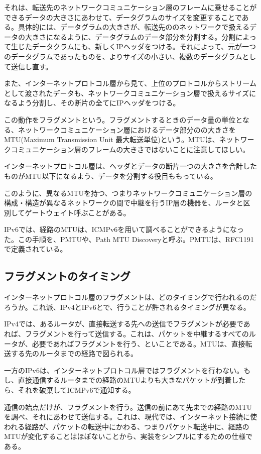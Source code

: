 それは、転送先のネットワークコミュニケーション層のフレームに乗せることができるデータの大きさにあわせて、データグラムのサイズを変更することである。具体的には、データグラムの大きさが、転送先ののネットワークで扱えるデータの大きさになるように、データグラムのデータ部分を分割する。分割によって生じたデータクラムにも、新しくIPヘッダをつける。それによって、元が一つのデータグラムであったものを、よりサイズの小さい、複数のデータグラムとして送信し直す。

また、インターネットプロトコル層から見て、上位のプロトコルからストリームとして渡されたデータも、ネットワークコミュニケーション層で扱えるサイズになるよう分割し、その断片の全てにIPヘッダをつける。

この動作をフラグメントという。フラグメントするときのデータ量の単位となる、ネットワークコミュニケーション層におけるデータ部分のの大きさをMTU(Maximum Transmission Unit 最大転送単位)という。MTUは、ネットワークコミュニケーション層のフレームの大きさではないことに注意してほしい。

インターネットプロトコル層は、ヘッダとデータの断片一つの大きさを合計したものがMTU以下になるよう、データを分割する役目ももっている。

このように、異なるMTUを持つ、つまりネットワークコミュニケーション層の構成・構造が異なるネットワークの間で中継を行うIP層の機器を、ルータと区別してゲートウェイト呼ぶことがある。

IPv6では、経路のMTUは、ICMPv6を用いて調べることができるようになった。この手順を、PMTUや、Path MTU Discoveryと呼ぶ。PMTUは、RFC1191で定義されている。

\subsection{フラグメントのタイミング}
インターネットプロトコル層のフラグメントは、どのタイミングで行われるのだろうか。これ派、IPv4とIPv6とで、行うことが許されるタイミングが異なる。

IPv4では、あるルータが、直接転送する先への送信でフラグメントが必要であれば、フラグメントを行って送信する。これは、パケットを中継するすべてのルータが、必要であればフラグメントを行う、といことである。MTUは、直接転送する先のルータまでの経路で図られる。

一方のIPv6は、インターネットプロトコル層ではフラグメントを行わない。もし、直接通信するルータまでの経路のMTUよりも大きなパケットが到着したら、それを破棄してICMPv6で通知する。


通信の始点だけが、フラグメントを行う。送信の前にあて先までの経路のMTUを調べ、それにあわせて送信する。これは、現代では、インターネット接続に使われる経路が、パケットの転送中にかわる、つまりパケット転送中に、経路のMTUが変化することはほぼないことから、実装をシンプルにするための仕様である。

